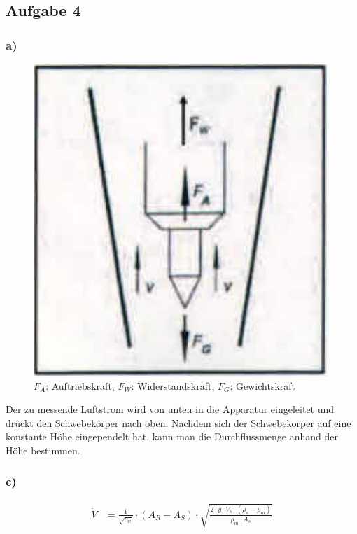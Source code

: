 \subsection{Aufgabe 4}

\subsubsection*{a)}

\begin{figure}[h]
\centering
\includegraphics[scale=0.6]{A2b.png}
\caption{$F_A$: Auftriebskraft, $F_W$: Widerstandskraft, $F_G$: Gewichtskraft}
\end{figure}

Der zu messende Luftstrom wird von unten in die Apparatur eingeleitet und drückt den Schwebekörper nach oben. Nachdem sich der Schwebekörper auf eine konstante Höhe eingependelt hat, kann man die Durchflussmenge anhand der Höhe bestimmen.

\subsubsection*{c)}

\begin{align*}
\dot{V} &= \frac{1}{\sqrt{c_w}} \cdot \left( A_R - A_S \right) \cdot \sqrt{\frac{2 \cdot g \cdot V_s \cdot \left( \rho_s - \rho_m \right)}{\rho_m \cdot A_s}}
\end{align*}

